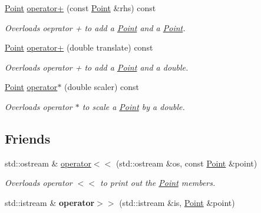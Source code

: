 \begin{DoxyCompactItemize}
\hyperlink{class_c_s170_1_1_point}{Point} \hyperlink{class_c_s170_1_1_point_af8729d0db3bab1361783f6fcd80d1d98}{operator+} (const \hyperlink{class_c_s170_1_1_point}{Point} \&rhs) const 
\begin{DoxyCompactList}\small\item\em Overloads oeprator + to add a \hyperlink{class_c_s170_1_1_point}{Point} and a \hyperlink{class_c_s170_1_1_point}{Point}. \end{DoxyCompactList}\item 
\hyperlink{class_c_s170_1_1_point}{Point} \hyperlink{class_c_s170_1_1_point_abb534eef9d3df23793c768e33504ded5}{operator+} (double translate) const 
\begin{DoxyCompactList}\small\item\em Overloads operator + to add a \hyperlink{class_c_s170_1_1_point}{Point} and a double. \end{DoxyCompactList}\item 
\hyperlink{class_c_s170_1_1_point}{Point} \hyperlink{class_c_s170_1_1_point_af89442cfa03627411faa5a2f7ebbe5fb}{operator$\ast$} (double scaler) const 
\begin{DoxyCompactList}\small\item\em Overloads operator $\ast$ to scale a \hyperlink{class_c_s170_1_1_point}{Point} by a double. \end{DoxyCompactList}\end{DoxyCompactItemize}
\subsection*{Friends}
\begin{DoxyCompactItemize}
\item 
std\-::ostream \& \hyperlink{class_c_s170_1_1_point_a97713abf198b35c58044f2c4d04a19ea}{operator$<$$<$} (std\-::ostream \&os, const \hyperlink{class_c_s170_1_1_point}{Point} \&point)
\begin{DoxyCompactList}\small\item\em Overloads operator $<$$<$ to print out the \hyperlink{class_c_s170_1_1_point}{Point} members. \end{DoxyCompactList}\item 
\hypertarget{class_c_s170_1_1_point_abb9fc4f71ef4ae8d7e642ab156ddf0ed}{std\-::istream \& {\bfseries operator$>$$>$} (std\-::istream \&is, \hyperlink{class_c_s170_1_1_point}{Point} \&point)}\label{class_c_s170_1_1_point_abb9fc4f71ef4ae8d7e642ab156ddf0ed}

\end{DoxyCompactItemize}


